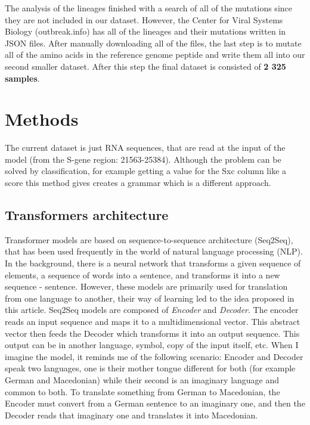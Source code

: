 \documentclass[conference,compsoc]{IEEEtran}
\begin{document}
The analysis of the lineages finished with a search of all of the mutations since they are not included in our dataset. However,  the Center for Viral Systems Biology (outbreak.info) \cite{ref21} has all of the lineages and their mutations written in JSON files. After manually downloading all of the files, the last step is to mutate all of the amino acids in the reference genome peptide and write them all into our second smaller dataset. After this step the final dataset is consisted of \textbf{2 325 samples}. 


\section{Methods}

The current dataset is just RNA sequences, that are read at the input of the model (from the S-gene region: 21563-25384).
Although the problem can be solved by classification, for example getting a value for the Sxc column like a score this method gives creates a grammar which is a different approach. 

\subsection{Transformers architecture}
Transformer models are based on sequence-to-sequence architecture (Seq2Seq), that has been used frequently in the world of natural language processing (NLP). \cite{ref22,ref23}  In the background, there is a neural network that transforms a given sequence of elements, a sequence of words into a sentence, and transforms it into a new sequence - sentence.
However, these models are primarily used for translation from one language to another, their way of learning led to the idea proposed in this article.
Seq2Seq models are composed of \textit{Encoder} and \textit{Decoder}. The encoder reads an input sequence and maps it to a multidimensional vector. This abstract vector then feeds the Decoder which transforms it into an output sequence. This output can be in another language, symbol, copy of the input itself, etc.
When I imagine the model, it reminds me of the following scenario: Encoder and Decoder speak two languages, one is their mother tongue different for both (for example German and Macedonian) while their second is an imaginary language and common to both. To translate something from German to Macedonian, the Encoder must convert from a German sentence to an imaginary one, and then the Decoder reads that imaginary one and translates it into Macedonian.
\end{document}
